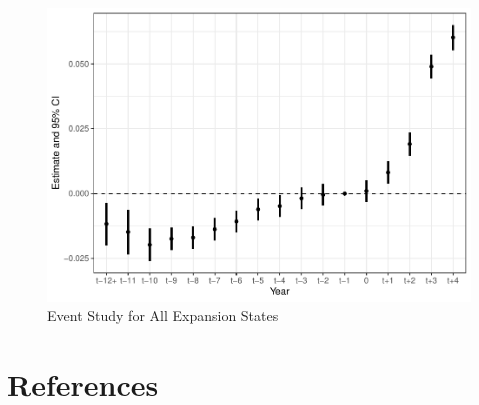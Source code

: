 \documentclass[
  12pt,
]{article}
\begin{document}
\begin{figure}
\centering
\includegraphics{solutions_files/figure-latex/event-study2-1.pdf}
\caption{\label{fig:event-study2}Event Study for All Expansion States}
\end{figure}

\newpage

\hypertarget{references}{%
\section{References}\label{references}}
\end{document}
